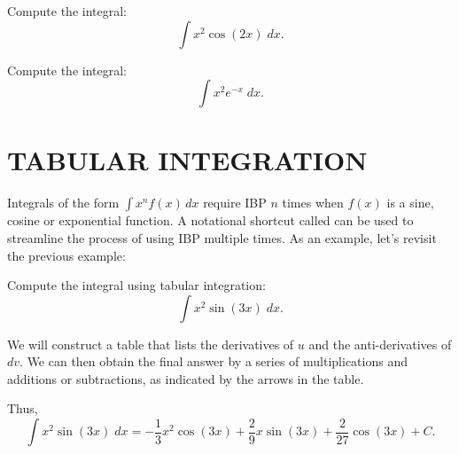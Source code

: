 \documentclass{ximera}
\begin{document}
\begin{problem}
Compute the integral:
  \[
  \int x^2\cos(2x) \;dx.
  \]

\end{problem}

\begin{problem}
Compute the integral:
  \[
  \int x^2e^{-x} \;dx.
  \]

\end{problem}

\section{TABULAR INTEGRATION}

Integrals of the form $\int x^n f(x) \,dx$ require IBP $n$ times when $f(x)$ is a sine, cosine or exponential function.
A notational shortcut called  can be used to streamline the process of using IBP multiple times.
As an example, let's revisit the previous example:

\begin{example}
Compute the integral using tabular integration:
  \[
  \int x^2\sin(3x) \;dx.
  \]

We will construct a table that lists the derivatives of $u$ and the anti-derivatives of $dv$.
We can then obtain the final answer by a series of multiplications and additions or subtractions, as indicated
by the arrows in the table.


\begin{image}[5cm]
\end{image}

Thus,
\[
  \int x^2\sin(3x) \;dx = -\frac13 x^2\cos(3x) + \frac29x\sin(3x) + \frac{2}{27} \cos(3x) + C.
  \]

\end{example}
\end{document}
